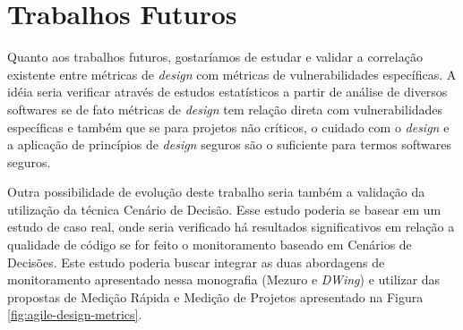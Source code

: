 \section{Trabalhos Futuros}

Quanto aos trabalhos futuros, gostaríamos de estudar e validar a correlação existente entre métricas de \emph{design} com métricas de vulnerabilidades específicas. A idéia seria verificar através de estudos estatísticos a partir de análise de diversos softwares se de fato métricas de \emph{design} tem relação direta com vulnerabilidades específicas e também que se para projetos não críticos, o cuidado com o \emph{design} e a aplicação de princípios de \emph{design} seguros são o suficiente para termos softwares seguros. 

Outra possibilidade de evolução deste trabalho seria também a validação da utilização da técnica Cenário de Decisão. Esse estudo poderia se basear em um estudo de caso real, onde seria verificado há resultados significativos em relação a qualidade de código se for feito o monitoramento baseado em Cenários de Decisões. Este estudo poderia buscar integrar as duas abordagens de monitoramento apresentado nessa monografia (Mezuro e \emph{DWing}) e utilizar das propostas de Medição Rápida e Medição de Projetos apresentado na Figura \ref{fig:agile-design-metrics}.

%


